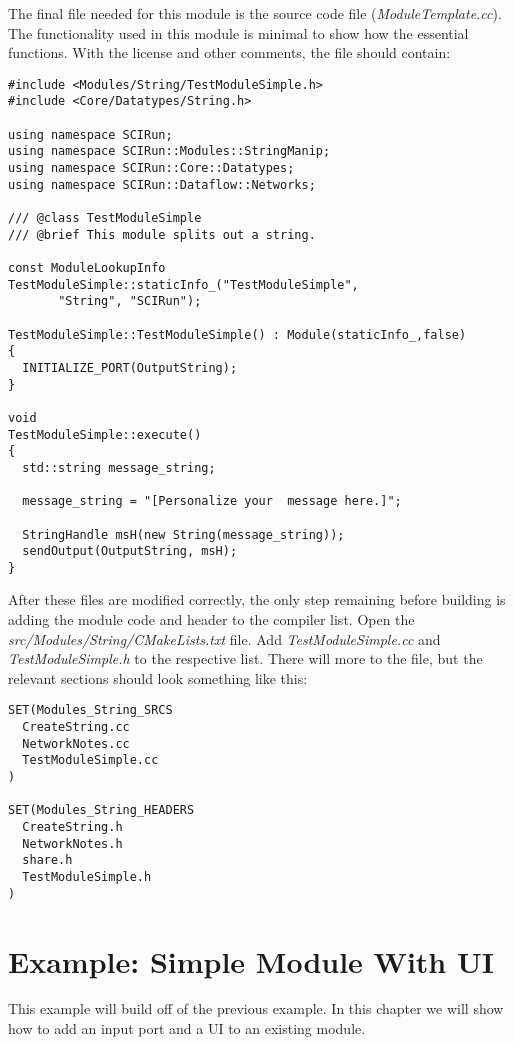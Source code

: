 \documentclass[fleqn,11pt,openany]{book}
\begin{document}
The final file needed for this module is the source code file (\emph{ModuleTemplate.cc}).
The functionality used in this module is minimal to show how the essential functions.  
With the license and other comments, the file should contain:
\begin{verbatim}
#include <Modules/String/TestModuleSimple.h>
#include <Core/Datatypes/String.h>

using namespace SCIRun;
using namespace SCIRun::Modules::StringManip;
using namespace SCIRun::Core::Datatypes;
using namespace SCIRun::Dataflow::Networks;

/// @class TestModuleSimple
/// @brief This module splits out a string. 

const ModuleLookupInfo TestModuleSimple::staticInfo_("TestModuleSimple", 
       "String", "SCIRun");

TestModuleSimple::TestModuleSimple() : Module(staticInfo_,false)
{
  INITIALIZE_PORT(OutputString);
}

void
TestModuleSimple::execute()
{  
  std::string message_string;
  
  message_string = "[Personalize your  message here.]";
  
  StringHandle msH(new String(message_string));
  sendOutput(OutputString, msH);
}
\end{verbatim}


After these files are modified correctly,  the only step remaining before building is adding the module code and header to the compiler list.  
Open the \emph{src/Modules/String/CMakeLists.txt} file.  
Add \emph{TestModuleSimple.cc} and \emph{TestModuleSimple.h} to the respective list.
There will more to the file, but the relevant sections should look something like this:
\begin{verbatim}
SET(Modules_String_SRCS
  CreateString.cc
  NetworkNotes.cc
  TestModuleSimple.cc
)

SET(Modules_String_HEADERS
  CreateString.h
  NetworkNotes.h
  share.h
  TestModuleSimple.h
)
\end{verbatim}



\chapter{Example: Simple Module With UI}

\begin{introduction}
This example will build off of the previous example.  In this chapter we will show how to add an input port and a UI to an existing module.
\end{introduction}
\end{document}

